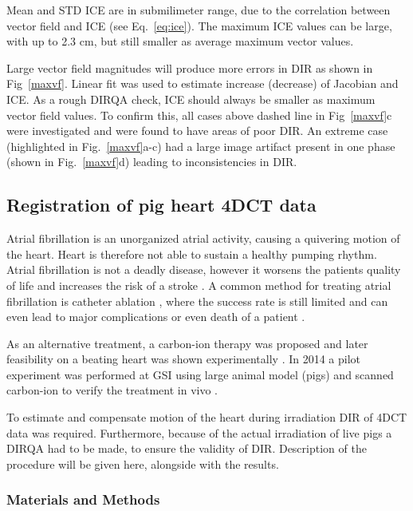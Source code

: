 \documentclass[type=dr, dr=rernat, accentcolor=tud7b,colorbacktitle, bigchapter, openright, twoside, 12pt ]{tudthesis}
\begin{document}
Mean and STD ICE are in submilimeter range, due to the correlation between vector field and ICE (see Eq.~\ref{eq:ice}). The maximum ICE values can be large, with up to 2.3 cm, 
but still smaller as average maximum vector values. 

Large vector field magnitudes will produce more errors in DIR as shown in Fig~\ref{maxvf}. Linear fit was used to estimate increase (decrease) of Jacobian and ICE. As a rough DIRQA check, ICE
should always be smaller as maximum vector field values. To confirm this, all cases above dashed line in Fig~\ref{maxvf}c were investigated and were found to have areas of poor DIR. An extreme case (highlighted in Fig.~\ref{maxvf}a-c)
had a large image artifact present in one phase (shown in Fig.~\ref{maxvf}d) leading to inconsistencies in DIR.


\newpage
\subsection{Registration of pig heart 4DCT data}

Atrial fibrillation is an unorganized atrial activity, causing a quivering motion of the heart. Heart is therefore not able to sustain a healthy pumping rhythm. Atrial fibrillation is not a
deadly disease, however it worsens the patients quality of life and increases the risk of a stroke \cite{Benjamin1998}. A common method for treating atrial fibrillation is catheter ablation \cite{January2014}, 
where the success rate is still limited and can even lead to major complications or even death of a patient \cite{Cappato2005,Cappato2010}.

As an alternative treatment, a carbon-ion therapy was proposed \cite{Bert2012} and later feasibility on a beating heart was shown experimentally \cite{Lehmann2015b}. In 2014 a pilot experiment was performed at GSI using large animal model (pigs) and
scanned carbon-ion to verify the treatment in vivo \cite{Lehmann2015}.

To estimate and compensate motion of the heart during irradiation DIR of 4DCT data was required. Furthermore, because of the actual irradiation of live pigs a DIRQA had to be made, to ensure the validity of DIR. Description of the procedure will be given here,
alongside with the results.


\subsubsection{Materials and Methods}
\end{document}
